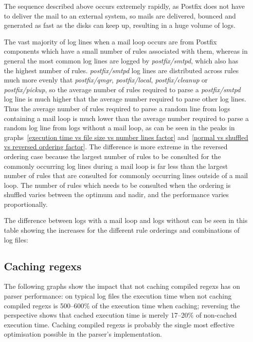 \documentclass[a4paper,12pt,draft]{article}
\begin{document}
The sequence described above occurs extremely rapidly, as Postfix does not
have to deliver the mail to an external system, so mails are delivered,
bounced and generated as fast as the disks can keep up, resulting in a huge
volume of logs.

The vast majority of log lines when a mail loop occurs are from Postfix
components which have a small number of rules associated with them, whereas
in general the most common log lines are logged by \textit{postfix/smtpd},
which also has the highest number of rules.  \textit{postfix/smtpd\/} log
lines are distributed across rules much more evenly that
\textit{postfix/qmgr}, \textit{postfix/local}, \textit{postfix/cleanup\/}
or \textit{postfix/pickup}, so the average number of rules required to
parse a \textit{postfix/smtpd\/} log line is much higher that the average
number required to parse other log lines.  Thus the average number of rules
required to parse a random line from logs containing a mail loop is much
lower than the average number required to parse a random log line from logs
without a mail loop, as can be seen in the peaks in graphs~\ref{execution
time vs file size vs number lines factor} and~\ref{normal vs shuffled vs
reversed ordering factor}.  The difference is more extreme in the reversed
ordering case because the largest number of rules to be consulted for the
commonly occurring log lines during a mail loop is far less than the
largest number of rules that are consulted for commonly occurring lines
outside of a mail loop.  The number of rules which needs to be consulted
when the ordering is shuffled varies between the optimum and nadir, and
the performance varies proportionally.

The difference between logs with a mail loop and logs without can be seen
in this table showing the increases for the different rule orderings and
combinations of log files:

\noindent




\subsection{Caching regexs}

The following graphs show the impact that not caching compiled regexs has
on parser performance: on typical log files the execution time when not
caching compiled regexs is 500--600\% of the execution time when caching;
reversing the perspective shows that cached execution time is merely
17--20\% of non-cached execution time.  Caching compiled regexs is probably
the single most effective optimisation possible in the parser's
implementation.
\end{document}
